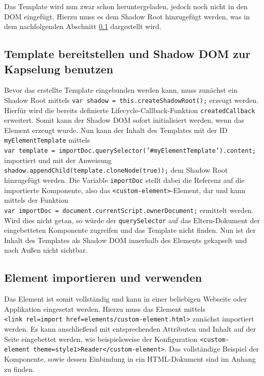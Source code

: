 

Das Template wird nun zwar schon heruntergeladen, jedoch noch nicht in den \ac{DOM} eingefügt. Hierzu muss es dem Shadow Root hinzugefügt werden, was in dem nachfolgenden Abschnitt \ref{template-bereitstellen-und-shadow-dom-zur-kapselung-benutzen} dargestellt wird.


\subsection{Template bereitstellen und Shadow \ac{DOM} zur Kapselung benutzen}\label{template-bereitstellen-und-shadow-dom-zur-kapselung-benutzen}

Bevor das erstellte Template eingebunden werden kann, muss zunächst ein Shadow Root mittels \texttt{var\ shadow\ =\ this.createShadowRoot();} erzeugt werden. Hierfür wird die bereits definierte Lifecycle-Callback-Funktion \texttt{createdCallback} erweitert. Somit kann der Shadow \ac{DOM} sofort initialisiert werden, wenn das Element erzeugt wurde. Nun kann der Inhalt des Templates mit der ID \texttt{myElementTemplate} mittels \texttt{var\ template\ =\ importDoc.querySelector('\#myElementTemplate').content;} importiert und mit der Anweisung \texttt{shadow.appendChild(template.cloneNode(true));} dem Shadow Root hinzugefügt werden. Die Variable \texttt{importDoc} stellt dabei die Referenz auf die importierte Komponente, also das \texttt{\textless{}custom-element\textgreater{}}-Element, dar und kann mittels der Funktion \texttt{var\ importDoc\ =\ document.currentScript.ownerDocument;} ermittelt werden. Wird dies nicht getan, so würde der \texttt{querySelector} auf das Eltern-Dokument der eingebetteten Komponente zugreifen und das Template nicht finden. Nun ist der Inhalt des Templates als Shadow \ac{DOM} innerhalb des Elements gekapselt und nach Außen nicht sichtbar.

\subsection{Element importieren und verwenden}\label{element-importieren-und-verwenden}

Das Element ist somit vollständig und kann in einer beliebigen Webseite oder Applikation eingesetzt werden. Hierzu muss das Element mittels \texttt{\textless{}link\ rel=\dq import\dq\ href=\dq elements/custom-element.html\dq\textgreater{}} zunächst importiert werden. Es kann anschließend mit entsprechenden Attributen und Inhalt auf der Seite eingebettet werden, wie beispielsweise der Konfiguration \texttt{\textless{}custom-element\ theme=\dq style1\dq\textgreater{}Reader\textless{}/custom-element\textgreater{}}. Das vollständige Beispiel der Komponente, sowie dessen Einbindung in ein \ac{HTML}-Dokument sind im Anhang zu finden.

